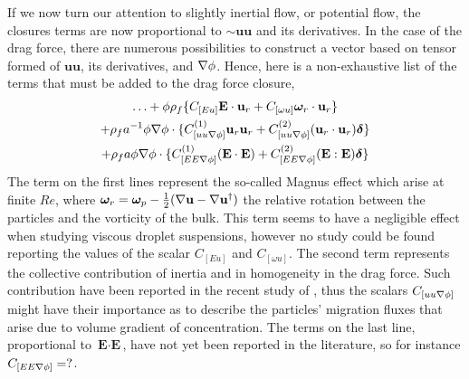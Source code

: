 If we now turn our attention to slightly inertial flow, or potential flow, the closures terms are now proportional to $\sim \textbf{uu}$ and its derivatives. 
In the case of the drag force, there are numerous possibilities to construct a vector based on tensor formed of $\textbf{uu}$, its derivatives, and $\mathbf{\nabla} \phi$. 
Hence, here is a non-exhaustive list of the terms that must be added to the drag force closure, 
\begin{multline}
    \ldots
    + \phi \rho_f \{  C_{[E u]} \textbf{E} \cdot \textbf{u}_{r} 
    + C_{[\omega u]} \bm\omega_r \cdot \textbf{u}_{r} \}\\
    + \rho_f a^{-1}  \phi \mathbf{\nabla}\phi \cdot \{ C_{[uu\mathbf{\nabla}\phi]}^{(1)} \textbf{u}_{r}\textbf{u}_{r}
    +  C_{[uu\mathbf{\nabla}\phi]}^{(2)} (\textbf{u}_{r}\cdot \textbf{u}_{r})\bm\delta\} \\
    + \rho_f a  \phi \mathbf{\nabla}\phi \cdot \{ C_{[EE\mathbf{\nabla}\phi]}^{(1)} (\textbf{E} \cdot  \textbf{E}) 
    +  C_{[EE\mathbf{\nabla}\phi]}^{(2)} (\textbf{E} : \textbf{E})\bm\delta \}
\end{multline}
The term on the first lines represent the so-called Magnus effect which arise at finite $Re$, where $\bm\omega_r = \bm\omega_p - \frac{1}{2}(\mathbf{\nabla} \textbf{u}-\mathbf{\nabla} \textbf{u}^\dagger)$ the relative rotation between the particles and the vorticity of the bulk. 
This term seems to have a negligible effect when studying viscous droplet suspensions, however no study could be found reporting the values of the scalar $C_{[Eu]}$  and $C_{[\omega u]}$. 
The second term represents the collective contribution of inertia and in homogeneity in the drag force. 
Such contribution have been reported in the recent study of \citet{wang2024effect}, thus the scalars $C_{[uu\mathbf{\nabla}\phi]}$ might have their importance as to describe the particles' migration fluxes that arise due to volume gradient of concentration. 
The terms on the last line, proportional to $\textbf{E}\cdot \textbf{E}$, have not yet been reported in the literature, so for instance $C_{[EE\mathbf{\nabla}\phi]} = ?$. 




